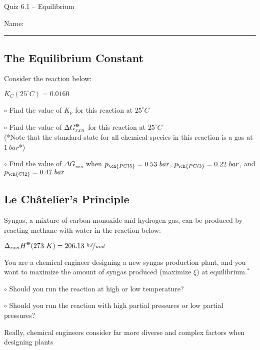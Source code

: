 \documentclass[11pt, letterpaper]{memoir}
\begin{document}
	\begin{center}
		{\large Quiz 6.1 -- Equilibrium}
	\end{center}
	{\large Name: \rule[-1mm]{4in}{.1pt} 


\subsection*{The Equilibrium Constant}
Consider the reaction below:

  \hspace{3em} $K_C(25^\circ C) = 0.0160$

\noindent $\circ$ Find the value of $K_p$ for this reaction at $25^\circ C$

\vspace{6em}
\noindent $\circ$ Find the value of $\Delta G^{\std}_{rxn}$ for this reaction at $25^\circ C$ \\
(*Note that the standard state for all chemical species in this reaction is a gas at $1~bar$*)

\vspace{6em}
\noindent $\circ$ Find the value of $\Delta G_{rxn}$ when $p_{\ch{PCl5}}=0.53~bar$, $p_{\ch{PCl3}}=0.22~bar$, and $p_{\ch{Cl2}}=0.47~bar$

\vspace{6em}
\subsection*{Le Ch\^atelier's Principle}

Syngas, a mixture of carbon monoxide and hydrogen gas, can be produced by reacting methane with water in the reaction below:

 \hspace{2em} $\Delta_{rxn}H^{\std}(273~K)=206.13~\nicefrac{kJ}{mol}$

\noindent You are a chemical engineer designing a new syngas production plant, and you want to maximize the amount of syngas produced (maximize $\xi$) at equilibrium.$^*$

\noindent $\circ$ Should you run the reaction at high or low temperature?

\vspace{2em}
\noindent $\circ$ Should you run the reaction with high partial pressures or low partial pressures?

\vspace{2em}
\noindent *Really, chemical engineers consider far more diverse and complex factors when designing plants

}
\end{document}
